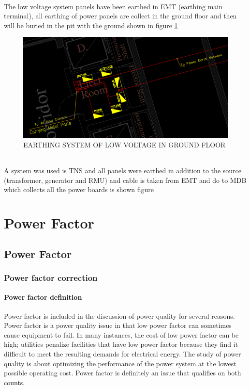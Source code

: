\documentclass[12pt,fleqn]{book} %
\begin{document}
\\
\\
\\
\\
\\
\\The low voltage system panels have been earthed in EMT (earthing main terminal), all earthing of power panels are collect in the ground floor and then will be buried in the pit with the ground shown in figure \ref{fig:earth 12}
\begin{figure}[!h]
    \centering
    \includegraphics[width=0.8\linewidth]{earth 12.png}
    \caption{EARTHING SYSTEM OF LOW VOLTAGE IN GROUND FLOOR }
    \label{fig:earth 12}
\end{figure}

\\A system was used is TNS and all panels were earthed in addition to the source (transformer, generator and RMU) and cable is taken from EMT and do to MDB which collects all the power boards is shown figure

\cleardoublepage
{}
\setlength{\columnsep}{0.75cm}
\printindex
\part{Power Factor}
\chapter{Power Factor}
\section{Power factor correction}
\subsection{Power factor definition}
Power factor is included in the discussion of power quality for several reasons. Power factor is a power quality issue in that low power factor can sometimes cause equipment to fail. In many instances, the cost of low power factor can be high; utilities penalize facilities that have low power factor because they find it difficult to meet the resulting demands for electrical energy. The study of power quality is about optimizing the performance of the power system at the lowest possible operating cost. Power factor is definitely an issue that qualifies on both counts.
\end{document}
